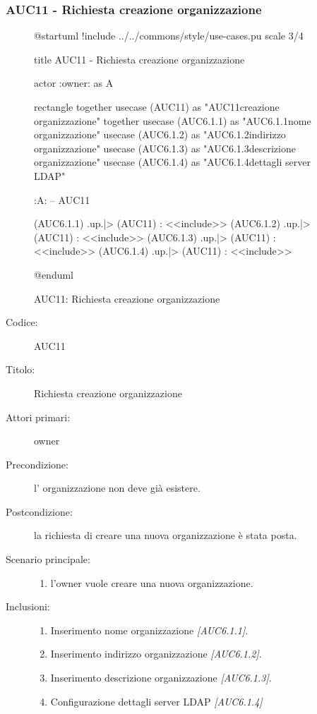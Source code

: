 \documentclass[casi-duso]{subfiles}
\begin{document}
\subsubsection{AUC11 - Richiesta creazione organizzazione}%
\label{subsub:AUC11}

\begin{figure}[h!] 
  \centering 
  \begin{plantuml}
  @startuml
  !include ../../commons/style/use-cases.pu
  scale 3/4

  title AUC11 - Richiesta creazione organizzazione

  actor :owner: as A

  rectangle {
    together {
      usecase (AUC11) as "AUC11\nRichiesta creazione organizzazione"
    }
    together {
      usecase (AUC6.1.1) as "AUC6.1.1\nInserisci nome organizzazione"
      usecase (AUC6.1.2) as "AUC6.1.2\nInserisci indirizzo organizzazione"
      usecase (AUC6.1.3) as "AUC6.1.3\nInserisci descrizione organizzazione"
      usecase (AUC6.1.4) as "AUC6.1.4\nConfigurazione dettagli server LDAP"
    }
  }

  :A: -- AUC11

  (AUC6.1.1) .up.|> (AUC11) : <<include>>
  (AUC6.1.2) .up.|> (AUC11) : <<include>>
  (AUC6.1.3) .up.|> (AUC11) : <<include>>
  (AUC6.1.4) .up.|> (AUC11) : <<include>>

  @enduml
  \end{plantuml} 
  \caption{AUC11: Richiesta creazione organizzazione} 
  \label{fig:auc11} 
\end{figure}

\begin{description}
  \item[Codice:] AUC11
  \item[Titolo:] Richiesta creazione organizzazione
  \item[Attori primari:] owner
  \item[Precondizione:] l' organizzazione non deve già esistere.
  \item[Postcondizione:] la richiesta di creare una nuova organizzazione è stata posta.
  \item[Scenario principale:]
  \begin{enumerate}
    \item l'owner vuole creare una nuova organizzazione.
  \end{enumerate}
  \item[Inclusioni:]
  \begin{enumerate}
    \item Inserimento nome organizzazione \emph{[AUC6.1.1]}.
    \item Inserimento indirizzo organizzazione \emph{[AUC6.1.2]}.
    \item Inserimento descrizione organizzazione \emph{[AUC6.1.3]}.
    \item Configurazione dettagli server LDAP \emph{[AUC6.1.4]}
  \end{enumerate}
\end{description}
\end{document}
